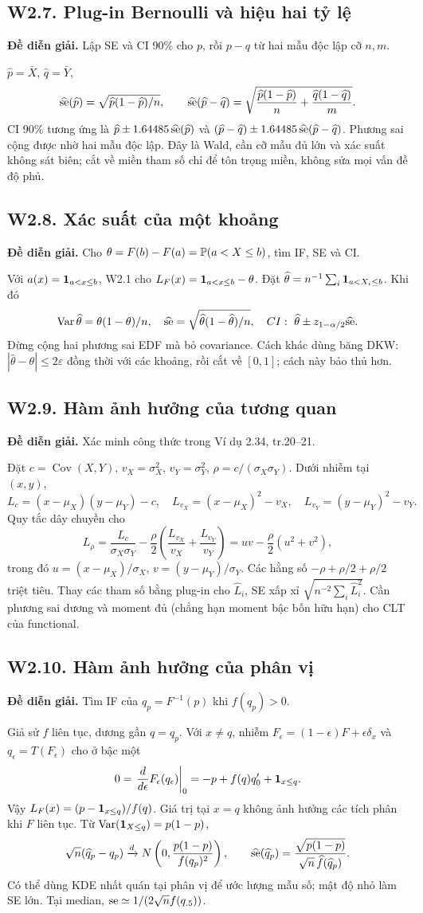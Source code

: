 \documentclass[11pt,a4paper]{article}
\DeclareMathOperator{\Var}{Var}\DeclareMathOperator{\Cov}{Cov}
\newcommand{\dto}{\xrightarrow{d}}\newcommand{\pto}{\xrightarrow{P}}
\newcommand{\supp}[3]{\subsection{#1. #2}\label{s:#1}\textbf{Đề diễn giải.} #3\par}
\begin{document}
\supp{W2.7}{Plug-in Bernoulli và hiệu hai tỷ lệ}{Lập SE và CI 90\% cho $p$, rồi $p-q$ từ hai mẫu độc lập cỡ $n,m$.}
$\widehat p=\bar X$, $\widehat q=\bar Y$,
\[
\widehat{\operatorname{se}}(\widehat p)=\sqrt{\widehat p(1-\widehat p)/n},\qquad
\widehat{\operatorname{se}}(\widehat p-\widehat q)=\sqrt{\frac{\widehat p(1-\widehat p)}n+\frac{\widehat q(1-\widehat q)}m}.
\]
CI 90\% tương ứng là $\widehat p\pm1.64485\,\widehat{\operatorname{se}}(\widehat p)$ và
$(\widehat p-\widehat q)\pm1.64485\,\widehat{\operatorname{se}}(\widehat p-\widehat q)$.
Phương sai cộng được nhờ hai mẫu độc lập. Đây là Wald, cần cỡ mẫu đủ lớn và xác suất không sát biên; cắt về miền tham số chỉ để tôn trọng miền, không sửa mọi vấn đề độ phủ.

\supp{W2.8}{Xác suất của một khoảng}{Cho $\theta=F(b)-F(a)=\mathbb P(a<X\le b)$, tìm IF, SE và CI.}
Với $a(x)=\mathbf 1_{a<x\le b}$, W2.1 cho $L_F(x)=\mathbf 1_{a<x\le b}-\theta$. Đặt
$\widehat\theta=n^{-1}\sum_i\mathbf 1_{a<X_i\le b}$. Khi đó
\[
\Var\widehat\theta=\theta(1-\theta)/n,\quad
\widehat{\se}=\sqrt{\widehat\theta(1-\widehat\theta)/n},\quad
CI:\ \widehat\theta\pm z_{1-\alpha/2}\widehat{\se}.
\]
Đừng cộng hai phương sai EDF mà bỏ covariance. Cách khác dùng băng DKW: $|\widehat\theta-\theta|\le2\varepsilon$ đồng thời với các khoảng, rồi cắt về $[0,1]$; cách này bảo thủ hơn.

\supp{W2.9}{Hàm ảnh hưởng của tương quan}{Xác minh công thức trong Ví dụ 2.34, tr.20--21.}
Đặt $c=\Cov(X,Y)$, $v_X=\sigma_X^2$, $v_Y=\sigma_Y^2$, $\rho=c/(\sigma_X\sigma_Y)$. Dưới nhiễm tại $(x,y)$,
\[
L_c=(x-\mu_X)(y-\mu_Y)-c,\quad
L_{v_X}=(x-\mu_X)^2-v_X,\quad L_{v_Y}=(y-\mu_Y)^2-v_Y.
\]
Quy tắc dây chuyền cho
\[
L_\rho=\frac{L_c}{\sigma_X\sigma_Y}-\frac\rho2\left(\frac{L_{v_X}}{v_X}+\frac{L_{v_Y}}{v_Y}\right)
=uv-\frac\rho2(u^2+v^2),
\]
trong đó $u=(x-\mu_X)/\sigma_X$, $v=(y-\mu_Y)/\sigma_Y$. Các hằng số $-\rho+\rho/2+\rho/2$ triệt tiêu. Thay các tham số bằng plug-in cho $\widehat L_i$, SE xấp xỉ $\sqrt{n^{-2}\sum_i\widehat L_i^2}$. Cần phương sai dương và moment đủ (chẳng hạn moment bậc bốn hữu hạn) cho CLT của functional.

\supp{W2.10}{Hàm ảnh hưởng của phân vị}{Tìm IF của $q_p=F^{-1}(p)$ khi $f(q_p)>0$.}
Giả sử $f$ liên tục, dương gần $q=q_p$. Với $x\ne q$, nhiễm $F_\epsilon=(1-\epsilon)F+\epsilon\delta_x$ và $q_\epsilon=T(F_\epsilon)$ cho ở bậc một
\[
0=\left.\frac d{d\epsilon}F_\epsilon(q_\epsilon)\right|_0
=-p+f(q)q'_0+\mathbf 1_{x\le q}.
\]
Vậy $L_F(x)=(p-\mathbf 1_{x\le q})/f(q)$. Giá trị tại $x=q$ không ảnh hưởng các tích phân khi $F$ liên tục. Từ $\Var(\1_{X\le q})=p(1-p)$,
\[
\sqrt n(\widehat q_p-q_p)\dto N\left(0,\frac{p(1-p)}{f(q_p)^2}\right),\qquad
\widehat{\se}(\widehat q_p)=\frac{\sqrt{p(1-p)}}{\sqrt n\,\widehat f(\widehat q_p)}.
\]
Có thể dùng KDE nhất quán tại phân vị để ước lượng mẫu số; mật độ nhỏ làm SE lớn. Tại median, $\operatorname{se}\simeq1/(2\sqrt n f(q_{.5}))$.
\end{document}

